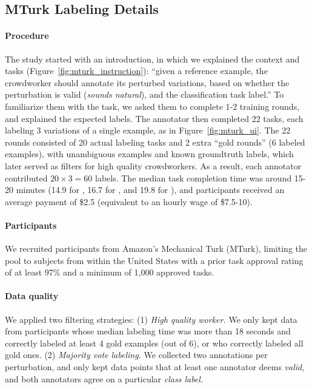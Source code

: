 \subsection{MTurk Labeling Details}
\label{appendix:label_instruct}


\paragraph{Procedure}
The study started with an introduction, in which we explained the context and tasks (Figure~\ref{fig:mturk_instruction}): 
``given a reference example, the crowdworker should annotate its perturbed variations, based on whether the perturbation is valid (\emph{sounds natural}), and the classification task label.''
To familiarize them with the task, we asked them to complete 1-2 training rounds, and explained the expected labels.
The annotator then completed 22 tasks, each labeling 3 variations of a single example, as in Figure~\ref{fig:mturk_ui}.
The 22 rounds consisted of 20 actual labeling tasks and 2 extra ``gold rounds'' (6 labeled examples), with unambiguous examples and known groundtruth labels, which later served as filters for high quality crowdworkers.
As a result, each annotator contributed $20 \times 3=60$ labels.
The median task completion time was around 15-20 minutes (14.9 for \qqp, 16.7 for \sst, and 19.8 for \nli), and participants received an average payment of \$2.5 (equivalent to an hourly wage of \$7.5-10).

\paragraph{Participants}
We recruited participants from Amazon's Mechanical Turk (MTurk), limiting the pool to subjects from within the United States with a prior task approval rating of at least 97\% and a minimum of 1,000 approved tasks.

\paragraph{Data quality}
We applied two filtering strategies: 
(1) \emph{High quality worker.} 
We only kept data from participants whose median labeling time was more than 18 seconds and correctly labeled at least 4 gold examples (out of 6), or who correctly labeled all gold ones.
(2) \emph{Majority vote labeling.}
We collected two annotations per perturbation, and only kept data points that at least one annotator deems \emph{valid}, and both annotators agree on a particular \emph{class label.}

